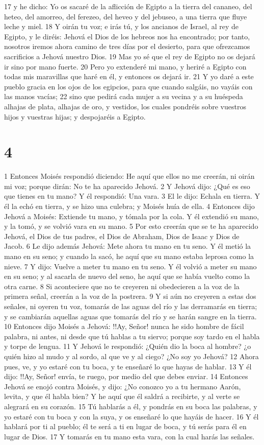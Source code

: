 17 y he dicho: Yo os sacaré de la aflicción de Egipto a la tierra del cananeo, del heteo, del amorreo, del ferezeo, del heveo y del jebuseo, a una tierra que fluye leche y miel.
18 Y oirán tu voz; e irás tú, y los ancianos de Israel, al rey de Egipto, y le diréis: Jehová el Dios de los hebreos nos ha encontrado; por tanto, nosotros iremos ahora camino de tres días por el desierto, para que ofrezcamos sacrificios a Jehová nuestro Dios.
19 Mas yo sé que el rey de Egipto no os dejará ir sino por mano fuerte.
20 Pero yo extenderé mi mano, y heriré a Egipto con todas mis maravillas que haré en él, y entonces os dejará ir.
21 Y yo daré a este pueblo gracia en los ojos de los egipcios, para que cuando salgáis, no vayáis con las manos vacías;
22 sino que pedirá cada mujer a su vecina y a su huéspeda alhajas de plata, alhajas de oro, y vestidos, los cuales pondréis sobre vuestros hijos y vuestras hijas; y despojaréis a Egipto.

\chapter{4}
1 Entonces Moisés respondió diciendo: He aquí que ellos no me creerán, ni oirán mi voz; porque dirán: No te ha aparecido Jehová.
2 Y Jehová dijo: ¿Qué es eso que tienes en tu mano? Y él respondió: Una vara.
3 El le dijo: Echala en tierra. Y él la echó en tierra, y se hizo una culebra; y Moisés huía de ella.
4 Entonces dijo Jehová a Moisés: Extiende tu mano, y tómala por la cola. Y él extendió su mano, y la tomó, y se volvió vara en su mano.
5 Por esto creerán que se te ha aparecido Jehová, el Dios de tus padres, el Dios de Abraham, Dios de Isaac y Dios de Jacob.
6 Le dijo además Jehová: Mete ahora tu mano en tu seno. Y él metió la mano en su seno; y cuando la sacó, he aquí que su mano estaba leprosa como la nieve.
7 Y dijo: Vuelve a meter tu mano en tu seno. Y él volvió a meter su mano en su seno; y al sacarla de nuevo del seno, he aquí que se había vuelto como la otra carne.
8 Si aconteciere que no te creyeren ni obedecieren a la voz de la primera señal, creerán a la voz de la postrera.
9 Y si aún no creyeren a estas dos señales, ni oyeren tu voz, tomarás de las aguas del río y las derramarás en tierra; y se cambiarán aquellas aguas que tomarás del río y se harán sangre en la tierra.
10 Entonces dijo Moisés a Jehová: !!Ay, Señor! nunca he sido hombre de fácil palabra, ni antes, ni desde que tú hablas a tu siervo; porque soy tardo en el habla y torpe de lengua.
11 Y Jehová le respondió: ¿Quién dio la boca al hombre? ¿o quién hizo al mudo y al sordo, al que ve y al ciego? ¿No soy yo Jehová?
12 Ahora pues, ve, y yo estaré con tu boca, y te enseñaré lo que hayas de hablar.
13 Y él dijo: !!Ay, Señor! envía, te ruego, por medio del que debes enviar.
14 Entonces Jehová se enojó contra Moisés, y dijo: ¿No conozco yo a tu hermano Aarón, levita, y que él habla bien? Y he aquí que él saldrá a recibirte, y al verte se alegrará en su corazón.
15 Tú hablarás a él, y pondrás en su boca las palabras, y yo estaré con tu boca y con la suya, y os enseñaré lo que hayáis de hacer.
16 Y él hablará por ti al pueblo; él te será a ti en lugar de boca, y tú serás para él en lugar de Dios.
17 Y tomarás en tu mano esta vara, con la cual harás las señales.

